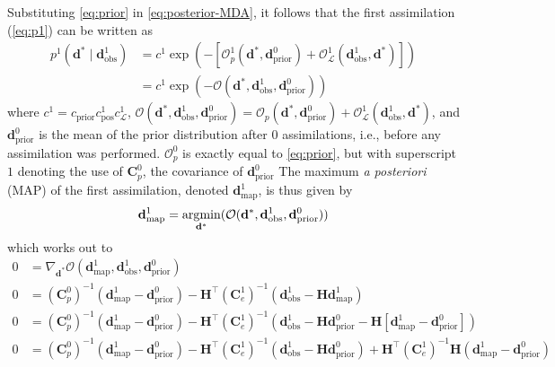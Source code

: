 Substituting \cref{eq:prior} in \cref{eq:posterior-MDA}, 
it follows that the first assimilation (\cref{eq:p1}) can be written as
%
\begin{align}
    p^1(\mathbf{d}^* \mid \mathbf{d}^1_\text{obs})
    &=
    c^1 \exp\left(
        -[
            \mathcal{O}^1_p(\mathbf{d}^*, \mathbf{d}^0_\text{prior}) + 
            \mathcal{O}^1_\mathcal{L}(\mathbf{d}^1_\text{obs}, \mathbf{d}^*)
        ]
    \right) \\
    &=
    c^1 \exp(-\mathcal{O}(\mathbf{d}^*, \mathbf{d}^1_\text{obs}, \mathbf{d}^0_\text{prior}))
\label{eq:posterior-MDA-1}
\end{align} 
%
where $c^1 = c_\text{prior} c^1_\text{pos} c^1_{\mathcal{L}}$,
$\mathcal{O}(\mathbf{d}^*, \mathbf{d}^1_\text{obs}, \mathbf{d}^0_\text{prior}) =  
\mathcal{O}_p(\mathbf{d}^*, \mathbf{d}^0_\text{prior}) + 
\mathcal{O}^1_\mathcal{L}(\mathbf{d}^1_\text{obs}, \mathbf{d}^*)$,
and $\mathbf{d}^0_\text{prior}$ is the mean of the prior distribution after 0 assimilations,
i.e., before any assimilation was performed.
%
$\mathcal{O}^0_p$ is exactly equal to \cref{eq:prior}, 
but with superscript $1$ denoting the use of $\mathbf{C}_p^0$, the covariance of $\mathbf{d}^0_\text{prior}$
%
The maximum \emph{a posteriori} (MAP) of the first assimilation,
denoted $\mathbf{d}^1_\text{map}$, is thus given by 
%
\begin{equation}
    \mathbf{d}^1_\text{map} 
    = \operatorname*{\arg\!\min}_{\mathbf{d}^*} (
        \mathcal{O}(\mathbf{d}^*, \mathbf{d}^1_\text{obs}, \mathbf{d}^0_\text{prior})
    )
\label{eq:argmin}
\end{equation}
%
which works out to
%
\begin{align}
    0 &= \nabla_{\mathbf{d}^*} \mathcal{O}(
        \mathbf{d}^1_\text{map}, 
        \mathbf{d}^1_\text{obs}, 
        \mathbf{d}^0_\text{prior}
    ) 
    \\
    0 &=
    (\mathbf{C}^0_p)^{-1} (\mathbf{d}^1_\text{map} - \mathbf{d}^0_\text{prior})
    -
    \mathbf{H}^\top (\mathbf{C}_e^1)^{-1} 
    (\mathbf{d}^1_\text{obs} - \mathbf{H}\mathbf{d}^1_\text{map})
    \\
    0 &= 
    (\mathbf{C}^0_p)^{-1} (\mathbf{d}^1_\text{map} - \mathbf{d}^0_\text{prior})
    -
    \mathbf{H}^\top (\mathbf{C}_e^1)^{-1} 
    (\mathbf{d}^1_\text{obs} - \mathbf{H}\mathbf{d}^0_\text{prior} - 
     \mathbf{H}[\mathbf{d}^1_\text{map} - \mathbf{d}^0_\text{prior}])
    \\
    0 &= 
    (\mathbf{C}^0_p)^{-1} (\mathbf{d}^1_\text{map} - \mathbf{d}^0_\text{prior})
    -
    \mathbf{H}^\top (\mathbf{C}_e^1)^{-1} (\mathbf{d}^1_\text{obs} - \mathbf{H}\mathbf{d}^0_\text{prior}) 
    +
    \mathbf{H}^\top (\mathbf{C}_e^1)^{-1} \mathbf{H} (\mathbf{d}^1_\text{map} - \mathbf{d}^0_\text{prior})
\end{align}
